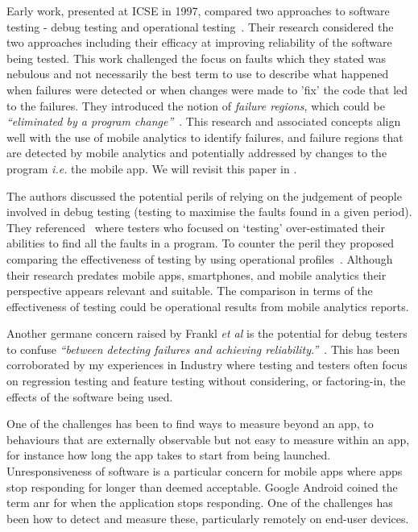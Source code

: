 Early work, presented at ICSE in 1997, compared two approaches to software testing - debug testing and operational testing~. Their research considered the two approaches including their efficacy at improving reliability of the software being tested. This work challenged the focus on faults which they stated was nebulous and not necessarily the best term to use to describe what happened when failures were detected or when changes were made to 'fix' the code that led to the failures. They introduced the notion of \emph{failure regions}, which could be \emph{``eliminated by a program change''}~. This research and associated concepts align well with the use of mobile analytics to identify failures, and failure regions that are detected by mobile analytics and potentially addressed by changes to the program \emph{i.e.} the mobile app. We will revisit this paper in .

The authors discussed the potential perils of relying on the judgement of people involved in debug testing (testing to maximise the faults found in a given period). They referenced~ where testers who focused on `testing' over-estimated their abilities to find all the faults in a program. To counter the peril they proposed comparing the effectiveness of testing by using operational profiles~. Although their research predates mobile apps, smartphones, and mobile analytics their perspective appears relevant and suitable. The comparison in terms of the effectiveness of testing could be operational results from mobile analytics reports.

Another germane concern raised by Frankl \emph{et al} is the potential for debug testers to confuse \emph{``between detecting failures and achieving reliability.''}~. This has been corroborated by my experiences in Industry where testing and testers often focus on regression testing and feature testing without considering, or factoring-in, the effects of the software being used.


One of the challenges has been to find ways to measure beyond an app, to behaviours that are externally observable but not easy to measure within an app, for instance how long the app takes to start from being launched. Unresponsiveness of software is a particular concern for mobile apps where apps stop responding for longer than deemed acceptable. Google Android coined the term \Gls{anr} for when the application stops responding. One of the challenges has been how to detect and measure these, particularly remotely on end-user devices. 


